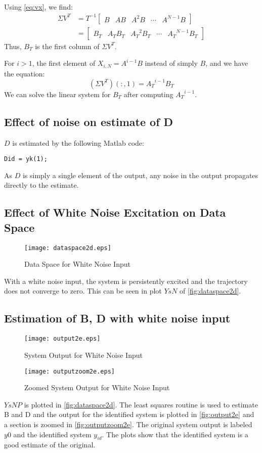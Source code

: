 \documentclass[11pt,a4paper]{article}
\begin{document}
Using \autoref{eq:vx}, we find:
\begin{align}
    \Sigma V^T &= T^{-1} \begin{bmatrix}
        B & AB & A^2B & \cdots & A^{N-1}B \end{bmatrix} \\
    &= \begin{bmatrix}
        B_T & A_TB_T & {A_T}^2B_T & \cdots & {A_T}^{N-1}B_T \end{bmatrix}
\end{align}
Thus, $B_T$ is the first column of $\Sigma V^T$.

For $i > 1$, the first element of $X_{i, N} = A^{i - 1}B$ instead of simply
$B$, and we have the equation:
\begin{equation}
    (\Sigma V^T)(:, 1) = {A_T}^{i - 1}B_T
\end{equation}
We can solve the linear system for $B_T$ after computing ${A_T}^{i-1}$.

\subsection{Effect of noise on estimate of D}
$D$ is estimated by the following Matlab code:
\begin{lstlisting}
Did = yk(1);
\end{lstlisting}
As $D$ is simply a single element of the output, any noise in the output
propagates directly to the estimate.

\subsection{Effect of White Noise Excitation on Data Space}
\begin{figure}
    \centering
    \texttt{[image: dataspace2d.eps]}
    \caption{Data Space for White Noise Input}
    \label{fig:dataspace2d}
\end{figure}
With a white noise input, the system is persistently excited and the trajectory
does not converge to zero. This can be seen in plot $YsN$ of
\autoref{fig:dataspace2d}.

\subsection{Estimation of B, D with white noise input}
\begin{figure}
    \centering
    \texttt{[image: output2e.eps]}
    \caption{System Output for White Noise Input}
    \label{fig:output2e}
\end{figure}
\begin{figure}
    \centering
    \texttt{[image: outputzoom2e.eps]}
    \caption{Zoomed System Output for White Noise Input}
    \label{fig:outputzoom2e}
\end{figure}
$YsNP$ is plotted in \autoref{fig:dataspace2d}. The least squares routine is used
to estimate B and D and the output for the identified system is plotted in
\autoref{fig:output2e} and a section is zoomed in \autoref{fig:outputzoom2e}.
The original system output is labeled $y0$ and the identified system $y_{id}$.
The plots show that the identified system is a good estimate of the original.
\end{document}

